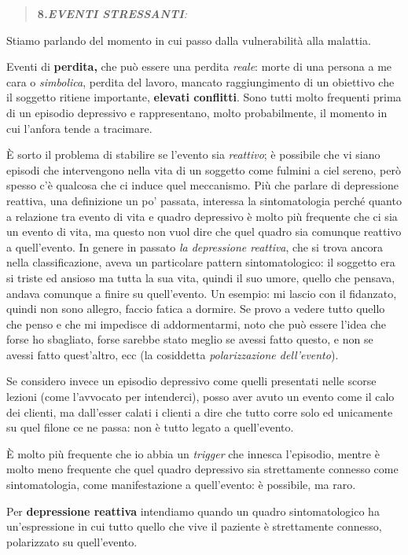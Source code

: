 \documentclass[]{article}
\begin{document}
\begin{quote}
\textbf{8\emph{.EVENTI STRESSANTI}}\emph{:}
\end{quote}

Stiamo parlando del momento in cui passo dalla vulnerabilità alla
malattia.

Eventi di \textbf{perdita,} che può essere una perdita \emph{reale}:
morte di una persona a me cara o \emph{simbolica}, perdita del lavoro,
mancato raggiungimento di un obiettivo che il soggetto ritiene
importante, \textbf{elevati conflitti}. Sono tutti molto frequenti prima
di un episodio depressivo e rappresentano, molto probabilmente, il
momento in cui l'anfora tende a tracimare.

È sorto il problema di stabilire se l'evento sia \emph{reattivo}; è
possibile che vi siano episodi che intervengono nella vita di un
soggetto come fulmini a ciel sereno, però spesso c'è qualcosa che ci
induce quel meccanismo. Più che parlare di depressione reattiva, una
definizione un po' passata, interessa la sintomatologia perché quanto a
relazione tra evento di vita e quadro depressivo è molto più frequente
che ci sia un evento di vita, ma questo non vuol dire che quel quadro
sia comunque reattivo a quell'evento. In genere in passato \emph{la
depressione reattiva}, che si trova ancora nella classificazione, aveva
un particolare pattern sintomatologico: il soggetto era si triste ed
ansioso ma tutta la sua vita, quindi il suo umore, quello che pensava,
andava comunque a finire su quell'evento. Un esempio: mi lascio con il
fidanzato, quindi non sono allegro, faccio fatica a dormire. Se provo a
vedere tutto quello che penso e che mi impedisce di addormentarmi, noto
che può essere l'idea che forse ho sbagliato, forse sarebbe stato meglio
se avessi fatto questo, e non se avessi fatto quest'altro, ecc (la
cosiddetta \emph{polarizzazione dell'evento}).

Se considero invece un episodio depressivo come quelli presentati nelle
scorse lezioni (come l'avvocato per intenderci), posso aver avuto un
evento come il calo dei clienti, ma dall'esser calati i clienti a dire
che tutto corre solo ed unicamente su quel filone ce ne passa: non è
tutto legato a quell'evento.

È molto più frequente che io abbia un \emph{trigger} che innesca
l'episodio, mentre è molto meno frequente che quel quadro depressivo sia
strettamente connesso come sintomatologia, come manifestazione a
quell'evento: è possibile, ma raro.

Per \textbf{depressione reattiva} intendiamo quando un quadro
sintomatologico ha un'espressione in cui tutto quello che vive il
paziente è strettamente connesso, polarizzato su quell'evento.
\end{document}
